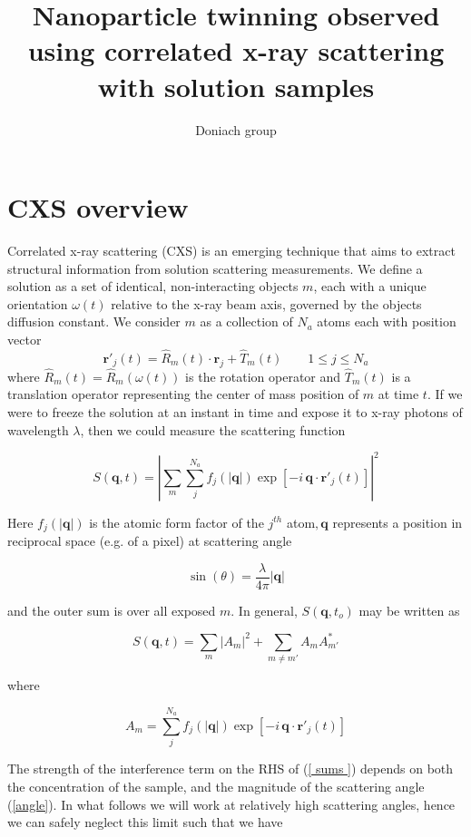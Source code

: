 \documentclass [11pt,fleqn]{article}
\title{Nanoparticle twinning observed using correlated x-ray scattering with solution samples}
\author{Doniach group}
\date{}
\def \be {\begin{equation}}
\def \ee {\end{equation}}
\begin{document}
 
\maketitle




\section{CXS overview}

Correlated x-ray scattering (CXS) is an emerging technique that aims to extract structural information from solution scattering measurements. We define a solution as a set of identical, non-interacting objects $m$, each with a unique orientation $\omega(t)$ relative to the x-ray beam axis, governed by the objects diffusion constant. We consider $m$ as a collection of $N_a$ atoms each with position vector 
\be
\bm r\prime_j (t) = \hat {R}_m (t)\cdot \bm r_j + \hat {T}_m(t) \qquad 1 \le j \le N_a
\ee 
where $\hat {R}_m(t) = \hat {R}_m (\omega(t))$ is the rotation operator and $\hat{T}_m (t)$ is a translation operator representing the center of mass position of $m$ at time $t$. If we were to freeze the solution at an instant in time and expose it to x-ray photons of wavelength $\lambda$, then we could measure the scattering function

\be
S(\bm q, t) = \left | \sum_m \sum_{j}^{N_a} f_j(|\bm q|) \exp [ -i \,\bm q \cdot \bm  r\prime _j (t)  ] \right |^2
\ee

Here $f_j( |\bm q|  )$ is the atomic form factor of the $j^{th}$ atom$, \bm q$ represents a position in reciprocal space (e.g. of a pixel) at scattering angle  

\be \label{angle}
\sin(\theta) = \frac{ \lambda }{ 4 \pi}|\bm q|
\ee

and the outer sum is over all exposed $m$. In general, $S(\bm q, t_o)$ may be written as

\be \label{ sums }
S( \bm q, t) = \sum_m \left | A_m \right|^2 + \sum _{ m \neq m\prime } A_m A^*_{m\prime}
\ee

where 

\be
A_m = \sum_{j}^{N_a} f_j(|\bm q|) \exp [ -i \,\bm q \cdot \bm  r\prime _j (t)  ] 
\ee

The strength of the interference term on the RHS of (\ref{ sums }) depends on both the concentration of the sample, and the magnitude of the scattering angle (\ref{angle}). In what follows we will work at relatively high scattering angles, hence we can safely neglect this limit such that we have
\end{document}

